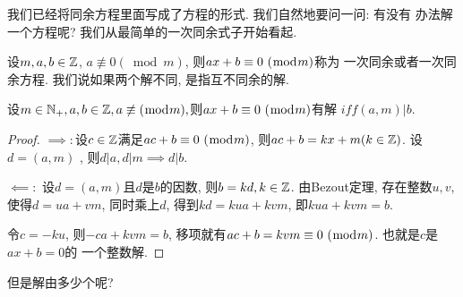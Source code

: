  我们已经将同余方程里面写成了方程的形式. 我们自然地要问一问: 有没有
办法解一个方程呢? 我们从最简单的一次同余式子开始看起. 

\begin{definition}
    设$m,a,b\in {\mathbb Z}$, $a\not \equiv 0 (\bmod m)$, 则${ax+b} \equiv {0} ~(\bmod {m})$称为
    一次同余或者一次同余方程. 我们说如果两个解不同, 是指互不同余的解. 
\end{definition}

\begin{theorem}
    设$m\in \mathbb N_+, a,b\in {\mathbb Z}, a\not \equiv (\bmod m), $则${ax+b} \equiv {0} ~(\bmod {m})$有解
    $iff (a,m)|b$.  
\end{theorem}

\begin{proof}
    $\implies: $设$c\in {\mathbb Z}$满足${ac+b} \equiv {0} ~(\bmod {m})$, 则$ac+b=kx+m(k\in {\mathbb Z})$. 设$d=(a,m)$
    , 则$d|a, d|m \implies d|b. $ 
    
    $\impliedby: $ 设$d=(a,m)$且$d$是$b$的因数, 则$b=kd, k\in {\mathbb Z}$. 由Bezout定理, 
    存在整数$u,v$, 使得$d=ua+vm$, 同时乘上$d$, 得到$kd=kua+kvm$, 即$kua+kvm=b$. 

    令$c=-ku$, 则$-ca+kvm=b$, 移项就有$ac+b={kvm} \equiv {0} ~(\bmod {m})$. 也就是$c$是$ax+b=0$的
    一个整数解.
\end{proof}

但是解由多少个呢? 